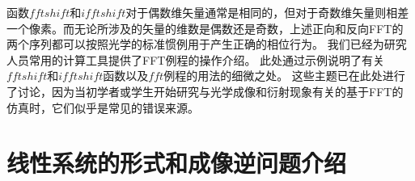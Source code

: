 \documentclass[10pt, UTF8]{ctexart}%
\numberwithin{equation}{section}
\numberwithin{figure}{section}
\newcommand{\InsertInlineEq}[1]{$#1$}
\begin{document}
\begin{sloppypar}
  函数\InsertInlineEq{fftshift}和\InsertInlineEq{ifftshift}对于偶数维矢量通常是相同的，但对于奇数维矢量则相差一个像素。而无论所涉及的矢量的维数是偶数还是奇数，上述正向和反向FFT的两个序列都可以按照光学的标准惯例用于产生正确的相位行为。
  我们已经为研究人员常用的计算工具提供了FFT例程的操作介绍。 此处通过示例说明了有关\InsertInlineEq{fftshift}和\InsertInlineEq{ifftshift}函数以及\InsertInlineEq{fft}例程的用法的细微之处。 这些主题已在此处进行了讨论，因为当初学者或学生开始研究与光学成像和衍射现象有关的基于FFT的仿真时，它们似乎是常见的错误来源。

\section{线性系统的形式和成像逆问题介绍}

  \end{sloppypar}
\end{document}
